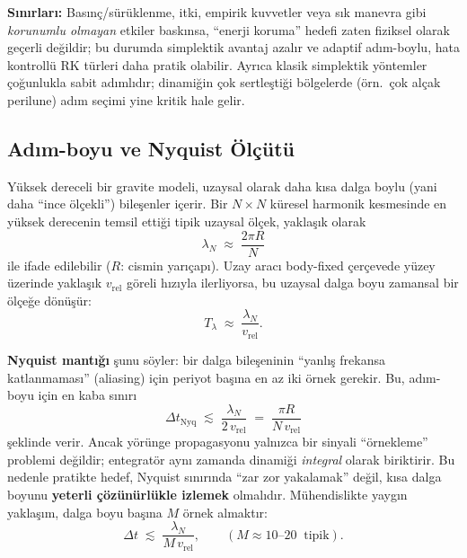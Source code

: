 \medskip
\noindent\textbf{Sınırları:}
Basınç/sürüklenme, itki, empirik kuvvetler veya sık manevra gibi \emph{korunumlu olmayan} etkiler baskınsa,
``enerji koruma'' hedefi zaten fiziksel olarak geçerli değildir; bu durumda simplektik avantaj azalır ve adaptif adım-boylu,
hata kontrollü RK türleri daha pratik olabilir. Ayrıca klasik simplektik yöntemler çoğunlukla sabit adımlıdır; dinamiğin
çok sertleştiği bölgelerde (örn.\ çok alçak perilune) adım seçimi yine kritik hale gelir.

\newpage
\subsection{Adım-boyu ve Nyquist Ölçütü}
\label{subsec:nyquist_stepsize}

Yüksek dereceli bir gravite modeli, uzaysal olarak daha kısa dalga boylu (yani daha “ince ölçekli”) bileşenler içerir.
Bir \(N\times N\) küresel harmonik kesmesinde en yüksek derecenin temsil ettiği tipik uzaysal ölçek,
yaklaşık olarak
\begin{equation}
\lambda_N \;\approx\; \frac{2\pi R}{N}
\end{equation}
ile ifade edilebilir (\(R\): cismin yarıçapı). Uzay aracı body-fixed çerçevede yüzey üzerinde yaklaşık
\(v_{\text{rel}}\) göreli hızıyla ilerliyorsa, bu uzaysal dalga boyu zamansal bir ölçeğe dönüşür:
\begin{equation}
T_{\lambda}\;\approx\;\frac{\lambda_N}{v_{\text{rel}}}.
\end{equation}

\textbf{Nyquist mantığı} şunu söyler: bir dalga bileşeninin “yanlış frekansa katlanmaması” (aliasing) için periyot başına
en az iki örnek gerekir. Bu, adım-boyu için en kaba sınırı
\begin{equation}
\Delta t_{\text{Nyq}} \;\lesssim\; \frac{\lambda_N}{2\,v_{\text{rel}}}
\;=\; \frac{\pi R}{N\,v_{\text{rel}}}
\end{equation}
şeklinde verir. Ancak yörünge propagasyonu yalnızca bir sinyali “örnekleme” problemi değildir; entegratör aynı zamanda
dinamiği \emph{integral} olarak biriktirir. Bu nedenle pratikte hedef, Nyquist sınırında “zar zor yakalamak” değil,
kısa dalga boyunu \textbf{yeterli çözünürlükle izlemek} olmalıdır. Mühendislikte yaygın yaklaşım, dalga boyu başına
\(M\) örnek almaktır:
\begin{equation}
\Delta t \;\lesssim\; \frac{\lambda_N}{M\,v_{\text{rel}}},
\qquad
(M \approx 10\text{--}20 \;\;\text{tipik}).
\end{equation}

